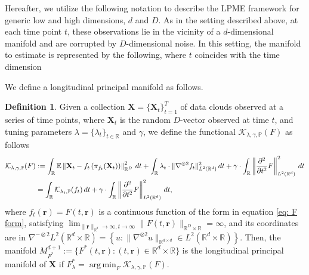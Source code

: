 \documentclass[12pt]{article}
\DeclareMathOperator*{\argmin}{arg\,min}
\theoremstyle{definition}
\newtheorem{definition}{Definition}
\begin{document}
Hereafter, we utilize the following notation to describe the LPME framework for generic low and high dimensions, $d$ and $D$.
 As in the setting described above, at each time point $t$, these observations lie in the vicinity of a $d$-dimensional manifold and are corrupted by $D$-dimensional noise. In this setting, the manifold to estimate is represented by the following, where $t$ coincides with the time dimension

We define a longitudinal principal manifold as follows.
\begin{definition}
  \label{def:lpme} Given a collection $\mathbf{X} = \{ \mathbf{X}_t \}_{t=1}^T$ of data clouds observed at a series of time points, where $\mathbf{X}_t$ is the random  $D$-vector observed at time $t$, and tuning parameters $\lambda=\{\lambda_t\}_{t\in\mathbb{R}}$ and $\gamma$, we define the functional $\mathcal{K}_{\lambda, \gamma, \mathbb{P}}(F)$ as follows
\begin{align}\label{eq:newKappa}
      \notag\mathcal{K}_{\lambda, \gamma, \mathbb{P}}(F) &:= \int_\mathbb{R} \mathbb{E}\left\|\mathbf{X}_t - f_t\left(\pi_{f_t}(\mathbf{X}_t)\right)\right\|_{\mathbb{R}^{D}}^2 \, dt + \int_\mathbb{R} \lambda_t \cdot\|\nabla^{\otimes 2}f_t\|_{L^2(\mathbb{R}^{d})}^2 \, dt + \gamma\cdot \int_{\mathbb{R}}\left\|\frac{\partial^2}{\partial t^2}F\right\|_{L^2(\mathbb{R}^d)}^2 \, dt \\
  &= \int_{\mathbb{R}}\mathcal{K}_{\lambda_t, \mathbb{P}}(f_t) \, dt + \gamma \cdot \int_{\mathbb{R}}\left\|\frac{\partial^2}{\partial t^2}F\right\|_{L^2(\mathbb{R}^d)}^2 \, dt,
\end{align}
\sloppy where $f_t(\mathbf{r})=F(t,\mathbf{r})$ is a continuous function of the form in equation \eqref{eq: F form}, satisfying $\lim_{\|\mathbf{r}\|_{\mathbb{R}^{d}} \to \infty, t \to \infty}\|F(t,\mathbf{r})\|_{\mathbb{R}^{D}\times\mathbb{R}} = \infty$, and its coordinates are in $\nabla^{-\otimes 2}L^2(\mathbb{R}^{d}\times\mathbb{R}) = \left\{u: \|\nabla^{\otimes 2} u\|_{\mathbb{R}^{d \times d}} \in L^2(\mathbb{R}^{d}\times\mathbb{R})\right\}$. Then, the manifold $M_{F^{*}}^{d+1}:=\{F^*(t,\mathbf{r}): (t,\mathbf{r})\in \mathbb{R}^d\times\mathbb{R}\}$ is the longitudinal principal manifold of $\mathbf{X}$ if $F_{\lambda}^{*} = \argmin_{F}\mathcal{K}_{\lambda, \gamma, \mathbb{P}}(F)$.
\end{definition}
\end{document}
